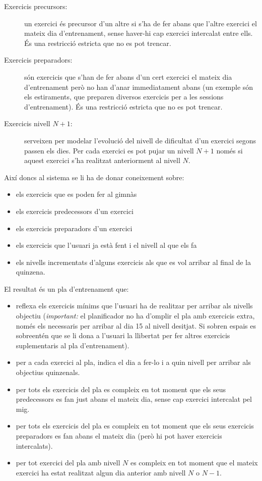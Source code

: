\documentclass[a4paper,12pt, UTF-8]{article}
\begin{document}
\begin{description}
	\item[Exercicis precursors:] un exercici és precursor d'un altre si s'ha de fer abans que l'altre exercici el mateix dia d'entrenament, sense haver-hi cap exercici intercalat entre ells. És una restricció estricta que no es pot trencar.
	\item[Exercicis preparadors:] són exercicis que s'han de fer abans d'un cert exercici el mateix dia d'entrenament però no han d'anar immediatament abans (un exemple són els estiraments, que preparen diversos exercicis per a les sessions d'entrenament). És una restricció estricta que no es pot trencar.
	\item[Exercicis nivell $N + 1$:] serveixen per modelar l'evolució del nivell de dificultat d'un exercici segons passen els dies. Per cada exercici es pot pujar un nivell $N + 1$ només si aquest exercici s'ha realitzat anteriorment al nivell $N$.
\end{description}

Així doncs al sistema se li ha de donar coneixement sobre:

\begin{itemize}
	\item els exercicis que es poden fer al gimnàs
	\item els exercicis predecessors d'un exercici
	\item els exercicis preparadors d'un exercici
	\item els exercicis que l'usuari ja està fent i el nivell al que els fa
	\item els nivells incrementats d'alguns exercicis als que es vol arribar al final de la quinzena.
\end{itemize}

El resultat és un pla d'entrenament que:
\begin{itemize}
	\item reflexa els exercicis mínims que l'usuari ha de realitzar per arribar als nivells objectiu (\emph{important:} el planificador no ha d'omplir el pla amb exercicis extra, només els necessaris per arribar al dia 15 al nivell desitjat. Si sobren espais es sobreentén que se li dona a l'usuari la llibertat per fer altres exercicis suplementaris al pla d'entrenament).
	\item per a cada exercici al pla, indica el dia a fer-lo i a quin nivell per arribar als objectius quinzenals.
	\item per tots els exercicis del pla es compleix en tot moment que els seus predecessors es fan just abans el mateix dia, sense cap exercici intercalat pel mig. 
	\item per tots els exercicis del pla es compleix en tot moment que els seus exercicis preparadors es fan abans el mateix dia (però hi pot haver exercicis intercalats).
	\item per tot exercici del pla amb nivell $N$ es compleix en tot moment que el mateix exercici ha estat realitzat algun dia anterior amb nivell $N$ o $N - 1$.
\end{itemize}
\end{document}

